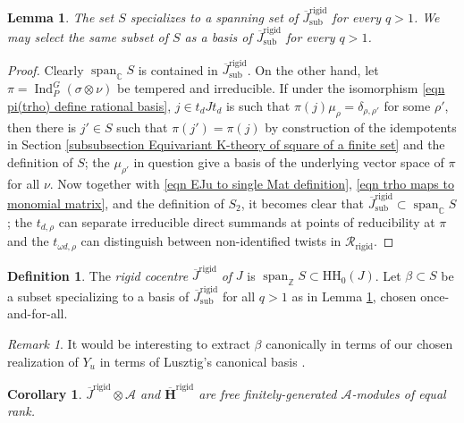 \documentclass[10pt]{article}
\DeclareMathOperator{\spn}{span}
\DeclareMathOperator{\Ind}{Ind}
\newcommand{\HH}{\mathbf{H}}
\newcommand{\Z}{\mathbb{Z}}
\newcommand{\C}{\mathbb{C}}
\newtheorem{cor}{Corollary}
\newtheorem{lem}{Lemma}
\theoremstyle{definition}
\newtheorem{dfn}{Definition}
\theoremstyle{remark}
\newtheorem{rem}{Remark}
\newcommand{\Hr}{\overline{\HH}^{\mathrm{rigid}}}
\newcommand{\Jr}{\overline{J}^{\mathrm{rigid}}}
\newcommand{\Jrs}{\overline{J}^{\mathrm{rigid}}_{\mathrm{sub}}}
\newcommand{\RHr}{\mathcal{R}_{\mathrm{rigid}}}
\newcommand{\hhh}{\mathrm{HH}_0}
\begin{document}
\begin{lem}
\label{lem Jrs basis and rank}
The set $S$ specializes to a spanning set of $\Jrs$ for  every $q>1$. We may select the same subset of $S$ as a 
basis of $\Jrs$ for every $q>1$.
%
\end{lem}
%
\begin{proof}
Clearly $\spn_\C S$ is contained in $\Jrs$. 
On the other hand, let $\pi=\Ind_P^G(\sigma\otimes\nu)$ be tempered and irreducible. If under the isomorphism
\eqref{eqn pi(trho) define rational basis}, $j\in t_dJt_d$ is such that $\pi(j)\mu_\rho=\delta_{\rho,\rho'}$
for some $\rho'$, then there is $j'\in S$ such that $\pi(j')=\pi(j)$ by construction of the idempotents in Section \ref{subsubsection Equivariant K-theory of square of a finite set} and the definition of $S$; the $\mu_{\rho'}$ in question give a basis of the underlying vector space of $\pi$ for all $\nu$. Now together
with \eqref{eqn EJu to single Mat definition}, \eqref{eqn trho maps to monomial matrix}, and the definition of $S_2$, it becomes
clear that $\Jrs\subset\spn_\C S$; the $t_{d,\rho}$ can separate irreducible 
direct summands at points of reducibility at $\pi$ and the $t_{\omega d,\rho}$ 
can distinguish between non-identified twists in $\RHr$.
%
\end{proof}
%
\begin{dfn}
\label{dfn beta and Jr}
The \emph{rigid cocentre} $\Jr$ \emph{of} $J$ is $\spn_\Z S\subset\hhh(J)$. Let $\beta\subset S$ be a subset 
specializing to a basis of $\Jrs$ for all $q>1$ as in Lemma \ref{lem Jrs basis and rank}, chosen once-and-for-all.
\end{dfn}
%
\begin{rem}
\label{rem extracting basis} 
It would be interesting to extract $\beta$ canonically in terms of our chosen realization of $Y_u$ in terms of 
Lusztig's canonical basis \cite{BL}.
\end{rem}
%
\begin{cor}
\label{cor Jr and Hr free of equal rank}
$\Jr\otimes\mathcal{A}$ and $\Hr$ are free finitely-generated $\mathcal{A}$-modules of equal rank.
\end{cor}
%
\end{document}
